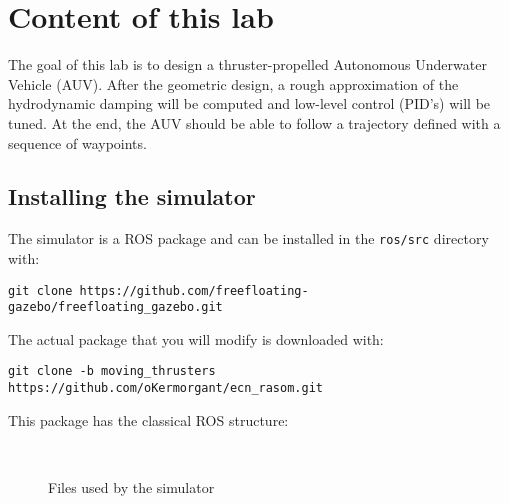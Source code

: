 \documentclass{ecnreport}
\begin{document}




\section{Content of this lab}

The goal of this lab is to design a thruster-propelled Autonomous Underwater Vehicle (AUV). After the geometric design, a rough approximation of the hydrodynamic damping will be computed
and low-level control (PID's) will be tuned. At the end, the AUV should be able to follow a trajectory defined with a sequence of waypoints.

\subsection{Installing the simulator}

The simulator is a ROS package and can be installed in the \texttt{ros/src} directory with:
\begin{center}
\begin{lstlisting}
git clone https://github.com/freefloating-gazebo/freefloating_gazebo.git
\end{lstlisting}
\end{center}

The actual package that you will modify is downloaded with:
\begin{center}
\begin{lstlisting}
git clone -b moving_thrusters https://github.com/oKermorgant/ecn_rasom.git
\end{lstlisting}
\end{center}
This package has the classical ROS structure:
\begin{figure}[h]
\begin{minipage}{.25\linewidth} ~ \end{minipage}
\begin{minipage}{.5\linewidth}
\end{minipage}
\caption{Files used by the simulator}
\end{figure}
\end{document}
